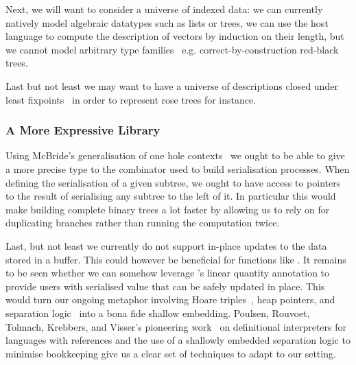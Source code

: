 Next, we will want to consider a universe of indexed data:
we can currently natively model algebraic datatypes such as lists or trees,
we can use the host language to compute the description of vectors by induction on their length,
but we cannot model arbitrary type families~\citep{DBLP:journals/fac/Dybjer94}
e.g. correct-by-construction red-black trees.

Last but not least we may want to have a universe of descriptions closed
under least fixpoints~\citep{DBLP:phd/ethos/Morris07}
in order to represent rose trees for instance.

\subsubsection{A More Expressive Library}

Using McBride's generalisation of one hole contexts~\citep{DBLP:conf/popl/McBride08}
we ought to be able to give a more precise type to the combinator
\IdrisFunction{(\#)} used to build serialisation processes.
%
When defining the serialisation of a given subtree, we ought to have access to
pointers to the result of serialising any subtree to the left of it. In particular
this would make building complete binary trees a lot faster by allowing us to rely
on  for duplicating branches rather than running the computation
twice.

Last, but not least we currently do not support in-place updates to
the data stored in a buffer.
This could however be beneficial for functions like .
%
It remains to be seen whether we can somehow leverage \idris{}'s
linear quantity annotation to provide users with serialised value that
can be safely updated in place.
%
This would turn our ongoing metaphor involving
Hoare triples~\citep{DBLP:journals/cacm/Hoare69},
heap pointers,
and separation logic~\citep{DBLP:conf/lics/Reynolds02}
into a bona fide shallow embedding.
%
Poulsen, Rouvoet, Tolmach, Krebbers, and Visser's
pioneering work~\citep{DBLP:journals/pacmpl/PoulsenRTKV18,DBLP:phd/basesearch/Rouvoet21}
on definitional interpreters for languages with references
and the use of a shallowly embedded separation logic to
minimise bookkeeping give us a clear set of techniques
to adapt to our setting.
